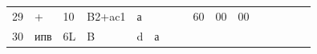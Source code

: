\documentclass[11pt,a4paper,oneside]{article}
\begin{document}
\begin{table}[]
\begin{tabular}{|l|l|l|l|l|l|l|l|l|l|l|l|l|l|l|l|}
29    & +       & 10  & B2+ac1 & а   &     &   &    & 60    & 00                                                           & 00  &                                                               &     &    &   &        \\
30    & ипв     & 6L  & B      & d   & а   &   &    &       &                                                              &     &                                                               &     &    &   &       
\end{tabular}
\end{table}
\end{document}

